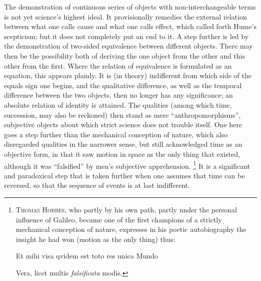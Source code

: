 \documentclass[12pt]{article}
\newcommand{\opage}[1]{\marginnote{\footnotesize\textit{[#1]}}}
\begin{document}
\bigskip
The demonstration of continuous series of objects with non-interchangeable
terms is not yet science's highest ideal. It provisionally remedies the
external relation between what one calls cause and what one calls effect,
which called forth Hume's scepticism; but it does not completely put an end
to it. A step further is led by the demonstration of two-sided equivalence
between different objects. There may then be the possibility both of
deriving the one object from the other and this other from the first. Where
the relation of equivalence is formulated as an equation, this appears
plainly. It is (in theory) indifferent from which side of the equals sign
one begins, and the qualitative difference, as well as the temporal
difference between the two objects, then no longer has any significance; an
absolute relation of identity is attained. The qualities (among which time,
succession, may also be reckoned) then stand as mere ``anthropomorphisms'',
subjective objects about which strict science does not trouble itself. One
here goes a step further than the mechanical conception of nature, which
also disregarded qualities in the narrower sense, but still acknowledged
time as an objective form, in that it saw motion in space as \opage{51}the only thing
that existed, although it was ``falsified'' by men's subjective
apprehension.%
\footnote{\textsc{Thomas Hobbes}, who partly by his own path, partly under
the personal influence of Galileo, became one of the first champions of a
strictly mechanical conception of nature, expresses in his poetic
autobiography the insight he had won (motion as the only thing)
thus:\par
\centerline{Et mihi visa qvidem est toto res unica Mundo}
\centerline{Vera, licet multis \emph{falsificata} modis.}}
It is a significant and paradoxical step that is taken further when one
assumes that time can be reversed, so that the sequence of events is at last
indifferent.
\end{document}
